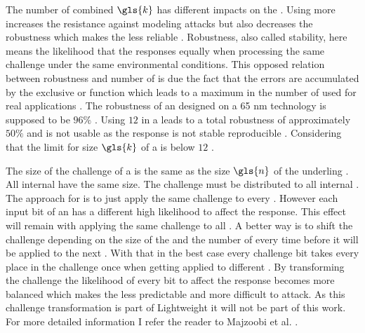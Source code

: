 The number of combined \apufs $\gls{k}$ has different impacts on the \puf.
Using more \apufs increases the resistance against modeling attacks but also decreases the robustness which makes the \puf less reliable \cite{Becker2015ThePUFs} \cite{Ganji2015WhyPUFs}.
Robustness, also called stability, here means the likelihood that the \apuf responses equally when processing the same challenge under the same environmental conditions.
This opposed relation between robustness and number of \apufs is due the fact that the errors are accumulated by the exclusive or function which leads to a maximum in the number of used \apufs for real applications \cite{Rostami2014RobustMatching}.
The robustness of an \apuf designed on a 65 nm technology is supposed to be $96 \%$ \cite{Rostami2014RobustMatching}.
Using $12$ \apufs in a \xpuf leads to a total robustness of approximately $50 \%$ and is not usable as the response is not stable reproducible \cite{Ganji2015WhyPUFs}.
Considering that the limit for size $\gls{k}$ of a \xpuf is below $12$ \apufs.

The size of the challenge of a \xpuf is the same as the size $\gls{n}$ of the underling \apufs.
All internal \apufs have the same size.
The challenge must be distributed to all internal \apufs.
The approach for \xpufs is to just apply the same challenge to every \apuf.
However each input bit of an \apuf has a different high likelihood to affect the response.
This effect will remain with applying the same challenge to all \apufs.
A better way is to shift the challenge depending on the size of the \puf and the number of \apufs every time before it will be applied to the next \apuf.
With that in the best case every challenge bit takes every place in the challenge once when getting applied to different \apufs.
By transforming the challenge the likelihood of every bit to affect the response becomes more balanced which makes the \puf less predictable and more difficult to attack.
As this challenge transformation is part of Lightweight \pufs it will not be part of this work.
For more detailed information I refer the reader to Majzoobi et al. \cite{Majzoobi2008LightweightPUFs} .


